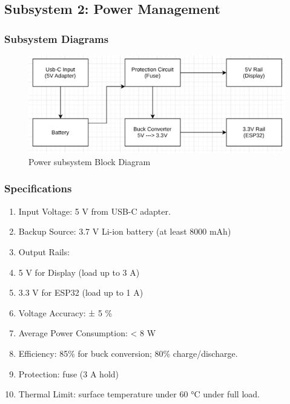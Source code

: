 \clearpage
\subsection{Subsystem 2: Power Management}

\subsubsection{Subsystem Diagrams}
\begin{figure}[h]
    \centering
    \includegraphics[width=16cm]{images/Power/BlockDiagram-power.jpg} %
    \caption{Power subsystem Block Diagram}
\end{figure} %

\subsubsection{Specifications}
\begin{enumerate}
    \item {Input Voltage: 5 V from USB-C adapter.}
    \item {Backup Source: 3.7 V Li-ion battery (at least 8000 mAh)}
    \item {Output Rails:}
    \item {5 V for Display (load up to 3 A)}
    \item {3.3 V for ESP32 (load up to 1 A)}
    \item {Voltage Accuracy: ± 5 \%}
    \item {Average Power Consumption: < 8 W}
    \item {Efficiency: 85\% for buck conversion; 80\% charge/discharge.}
    \item {Protection: fuse (3 A hold)}
    \item {Thermal Limit: surface temperature under 60 °C under full load.}
\end{enumerate}

